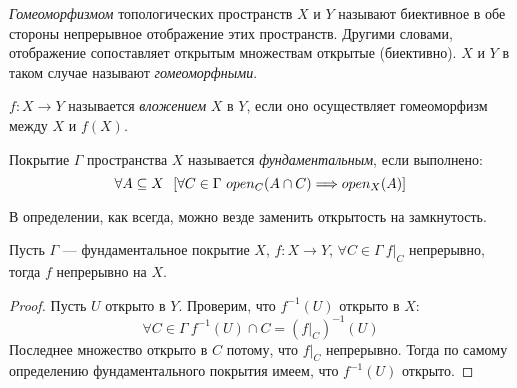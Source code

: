 \begin{definition}
	\textit{Гомеоморфизмом} топологических пространств $X$ и $Y$ называют
	биективное в обе стороны непрерывное отображение этих пространств. Другими
	словами, отображение сопоставляет открытым множествам открытые (биективно).
	$X$ и $Y$ в таком случае называют \textit{гомеоморфными}.
\end{definition}

\begin{definition}
	$f \colon X \to Y$ называется \textit{вложением} $X$ в $Y$, если оно
	осуществляет гомеоморфизм между $X$ и $f(X)$.
\end{definition}

\begin{definition}
	Покрытие $\Gamma$ пространства $X$ называется \textit{фундаментальным},
	если выполнено:
\[
	\forall A \subseteq X~~ [\forall C \in \Gamma~ open_C(A \cap C) \Longrightarrow open_X(A)]
\]
\end{definition}

\begin{remark}
	В определении, как всегда, можно везде заменить открытость на замкнутость.
\end{remark}

\begin{theorem}
	Пусть $\Gamma$ --- фундаментальное покрытие $X$, $f \colon X \to Y$,
	$\forall C \in \Gamma~ f\big|_C$ непрерывно, тогда $f$ непрерывно на $X$.
\end{theorem}
\begin{proof}
	Пусть $U$ открыто в $Y$. Проверим, что $f^{-1}(U)$ открыто в $X$:
\[
	\forall C \in \Gamma~ f^{-1}(U) \cap C = \left(f\big|_C\right)^{-1}(U)
\]
	Последнее множество открыто в $C$ потому, что $f\big|_C$ непрерывно.
	Тогда по самому определению фундаментального покрытия имеем, что
	$f^{-1}(U)$ открыто.
\end{proof}

